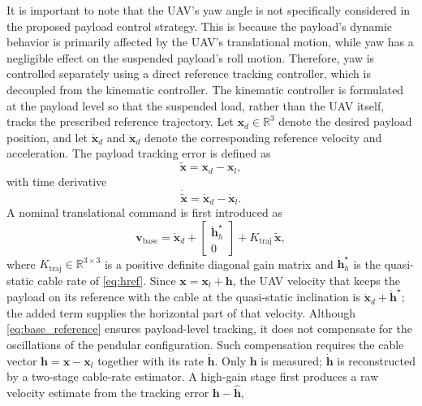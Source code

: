 \documentclass[sn-mathphys-num]{sn-jnl}
\theoremstyle{thmstyleone}%
\theoremstyle{thmstyletwo}%
\theoremstyle{thmstylethree}%
\begin{document}
It is important to note that the UAV's yaw angle is not specifically considered in the proposed payload control strategy. This is because the payload's dynamic behavior is primarily affected by the UAV's translational motion, while yaw has a negligible effect on the suspended payload's roll motion. Therefore, yaw is controlled separately using a direct reference tracking controller, which is decoupled from the kinematic controller.
The kinematic controller is formulated at the payload level so that the suspended load, rather than the UAV itself, tracks the prescribed reference trajectory. Let $\mathbf{x}_d\in\mathbb{R}^3$ denote the desired payload position, and let $\dot{\mathbf{x}}_d$ and $\ddot{\mathbf{x}}_d$ denote the corresponding reference velocity and acceleration. The payload tracking error is defined as
\begin{equation}
\tilde{\mathbf{x}} = \mathbf{x}_d - \mathbf{x}_l,
\label{eq:payload_tracking_error}
\end{equation}
with time derivative
\begin{equation}
\dot{\tilde{\mathbf{x}}} = \dot{\mathbf{x}}_d - \dot{\mathbf{x}}_l.
\label{eq:payload_tracking_error_dot}
\end{equation}
A nominal translational command is first introduced as
\begin{equation}
\mathbf{v}_{\mathrm{base}}
=
\dot{\mathbf{x}}_d
+
\begin{bmatrix}\dot{\mathbf{h}}_h^\star\\ 0\end{bmatrix}
+
K_{\mathrm{traj}}\,\tilde{\mathbf{x}},
\label{eq:base_reference}
\end{equation}
where $K_{\mathrm{traj}}\in\mathbb{R}^{3\times 3}$ is a positive definite diagonal gain matrix and $\dot{\mathbf{h}}_h^\star$ is the quasi-static cable rate of \eqref{eq:href}. Since $\mathbf{x}=\mathbf{x}_l+\mathbf{h}$, the UAV velocity that keeps the payload on its reference with the cable at the quasi-static inclination is $\dot{\mathbf{x}}_d+\dot{\mathbf{h}}^\star$; the added term supplies the horizontal part of that velocity. Although \eqref{eq:base_reference} ensures payload-level tracking, it does not compensate for the oscillations of the pendular configuration. Such compensation requires the cable vector $\mathbf{h}=\mathbf{x}-\mathbf{x}_l$ together with its rate $\dot{\mathbf{h}}$. Only $\mathbf{h}$ is measured; $\dot{\mathbf{h}}$ is reconstructed by a two-stage cable-rate estimator. A high-gain stage first produces a raw velocity estimate from the tracking error $\mathbf{h}-\hat{\mathbf{h}}$, 
\end{document}
